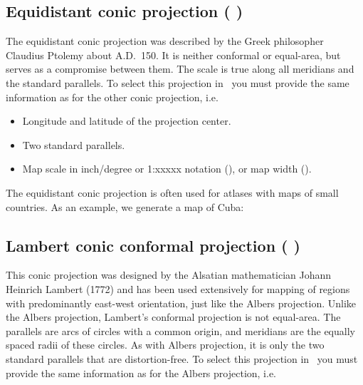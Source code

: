 

\subsection{Equidistant conic projection ( )}

The equidistant conic projection was described by the Greek
philosopher Claudius Ptolemy about A.D.\ 150.  It is neither
conformal or equal-area, but serves as a compromise between them.
The scale is true along all meridians and the standard parallels.
To select this projection in \GMT\ you must
provide the same information as for the other conic projection, i.e.

\begin{itemize}
\item Longitude and latitude of the projection center.
\item Two standard parallels.
\item Map scale in inch/degree or 1:xxxxx notation (), or map width ().
\end{itemize}

The equidistant conic projection is often used for atlases with
maps of small countries.  As an example, we generate a map of
Cuba:




\subsection{Lambert conic conformal projection ( )}

This conic projection was designed by the Alsatian mathematician Johann Heinrich Lambert (1772) and has been
used extensively for mapping of regions with predominantly east-west
orientation, just like the Albers projection.  Unlike the Albers
projection, Lambert's conformal projection is not equal-area.
The parallels are arcs of circles with a common origin, and
meridians are the equally spaced radii of these circles.  As with
Albers projection, it is only the two standard parallels that are
distortion-free.  To select this projection in \GMT\ you must
provide the same information as for the Albers projection, i.e.

